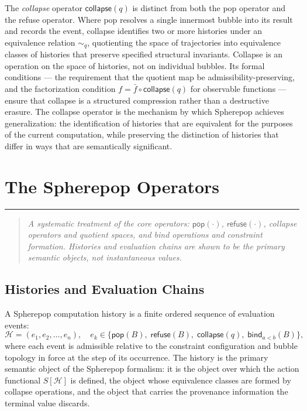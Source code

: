 \documentclass[12pt,openany]{book}
\theoremstyle{plain}
\theoremstyle{definition}
\theoremstyle{remark}
\newcommand{\spop}[1]{\mathsf{pop}\!\left(#1\right)}
\newcommand{\srefuse}[1]{\mathsf{refuse}\!\left(#1\right)}
\newcommand{\scollapse}[1]{\mathsf{collapse}\!\left(#1\right)}
\newcommand{\sbind}[2]{\mathsf{bind}_{#1}\!\left(#2\right)}
\newcommand{\shist}{\mathcal{H}}
\newcommand{\chapterrule}{%
  \vspace{4pt}%
  {\color{SpherepopBlue}\rule{\textwidth}{0.8pt}}%
  \vspace{10pt}%
}
\newenvironment{chapterprecis}{%
  \begin{quote}\small\itshape}{%
  \end{quote}\medskip}
\begin{document}
The \emph{collapse} operator $\scollapse{q}$ is distinct from both the pop operator and the refuse operator. Where pop resolves a single innermost bubble into its result and records the event, collapse identifies two or more histories under an equivalence relation $\sim_q$, quotienting the space of trajectories into equivalence classes of histories that preserve specified structural invariants. Collapse is an operation on the space of histories, not on individual bubbles. Its formal conditions — the requirement that the quotient map be admissibility-preserving, and the factorization condition $f = \bar{f} \circ \scollapse{q}$ for observable functions — ensure that collapse is a structured compression rather than a destructive erasure. The collapse operator is the mechanism by which Spherepop achieves generalization: the identification of histories that are equivalent for the purposes of the current computation, while preserving the distinction of histories that differ in ways that are semantically significant.

\chapter{The Spherepop Operators}
\chapterrule

\begin{chapterprecis}
A systematic treatment of the core operators: \(\spop{\cdot}\),
\(\srefuse{\cdot}\), collapse operators and quotient spaces, and
bind operations and constraint formation. Histories and evaluation
chains are shown to be the primary semantic objects, not
instantaneous values.
\end{chapterprecis}

\section{Histories and Evaluation Chains}

A Spherepop computation history is a finite ordered sequence of evaluation events:
\[
  \shist = (e_1, e_2, \ldots, e_n), \quad e_k \in \bigl\{\spop{B},\; \srefuse{B},\; \scollapse{q},\; \sbind{a<b}{B}\bigr\},
\]
where each event is admissible relative to the constraint configuration and bubble topology in force at the step of its occurrence. The history is the primary semantic object of the Spherepop formalism: it is the object over which the action functional $S[\shist]$ is defined, the object whose equivalence classes are formed by collapse operations, and the object that carries the provenance information the terminal value discards.
\end{document}
